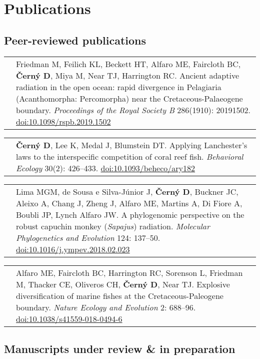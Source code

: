 \documentclass[10pt]{article}
\begin{document}
\section*{Publications}

\subsection*{Peer-reviewed publications}

\begin{tabularx}{\textwidth}{>{\raggedleft\arraybackslash}p{2.2cm} X}
2019 & Friedman M, Feilich KL, Beckett HT, Alfaro ME, Faircloth BC, \textbf{\v{C}ern\'{y} D}, Miya M, Near TJ, Harrington RC. Ancient adaptive radiation in the open ocean: rapid divergence in Pelagiaria (Acanthomorpha: Percomorpha) near the Cretaceous-Palaeogene boundary. \textit{Proceedings of the Royal Society B} 286(1910): 20191502. \href{http://doi.org/10.1098/rspb.2019.1502}{doi:10.1098/rspb.2019.1502}
\end{tabularx}
\begin{tabularx}{\textwidth}{>{\raggedleft\arraybackslash}p{2.2cm} X}
2018 & \textbf{\v{C}ern\'{y} D}, Lee K, Medal J, Blumstein DT. Applying Lanchester's laws to the interspecific competition of coral reef fish. \textit{Behavioral Ecology} 30(2): 426--433. \href{http://doi.org/10.1093/beheco/ary182}{doi:10.1093/beheco/ary182}
\end{tabularx}
\begin{tabularx}{\textwidth}{>{\raggedleft\arraybackslash}p{2.2cm} X}
2018 & Lima MGM, de Sousa e Silva-J\'{u}nior J, \textbf{\v{C}ern\'{y} D}, Buckner JC, Aleixo A, Chang J, Zheng J, Alfaro ME, Martins A, Di Fiore A, Boubli JP, Lynch Alfaro JW. A phylogenomic perspective on the robust capuchin monkey (\textit{Sapajus}) radiation. \textit{Molecular Phylogenetics and Evolution} 124: 137--50. \href{http://doi.org/10.1016/j.ympev.2018.02.023}{doi:10.1016/j.ympev.2018.02.023}
\end{tabularx}
\begin{tabularx}{\textwidth}{>{\raggedleft\arraybackslash}p{2.2cm} X}
2018 & Alfaro ME, Faircloth BC, Harrington RC, Sorenson L, Friedman M, Thacker CE, Oliveros CH, \textbf{\v{C}ern\'{y} D}, Near TJ. Explosive diversification of marine fishes at the Cretaceous-Paleogene boundary. \textit{Nature Ecology and Evolution} 2: 688--96. \href{http://doi.org/10.1038/s41559-018-0494-6}{doi:10.1038/s41559-018-0494-6}
\end{tabularx}

\subsection*{Manuscripts under review \& in preparation}
\end{document}
